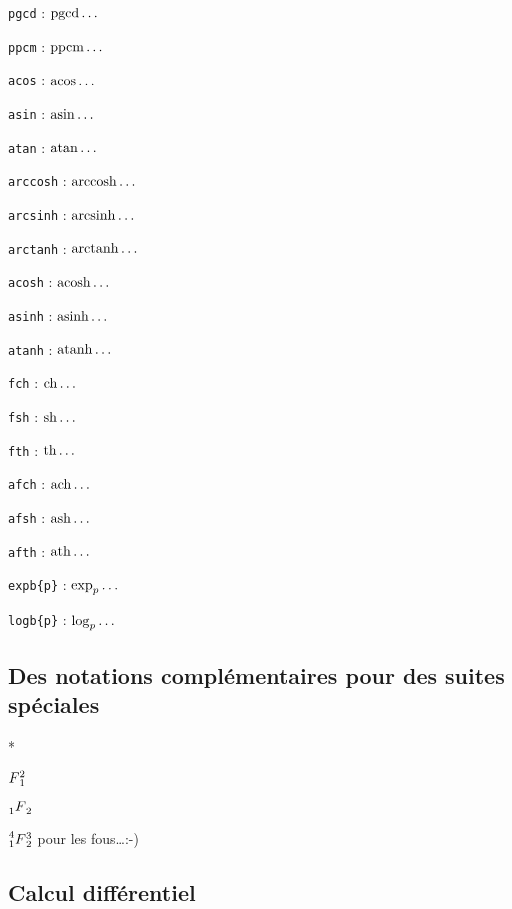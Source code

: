 \documentclass[12pt,a4paper]{article}
\makeatletter
\theoremstyle{definition}
\newcounter{paraexample}[subsubsection]
\newcommand\@newexample@abstract[2]{%
	\paragraph{%
		#1%
		\if\relax\detokenize{#2}\relax\else {} -- #2\fi%
	}%
}
\newcommand\newparaexample{\@ifstar{\@newparaexample@star}{\@newparaexample@no@star}}
\newcommand\@newparaexample@no@star[1]{%
	\refstepcounter{paraexample}%
	\@newexample@abstract{Exemple \theparaexample}{#1}%
}
\newcommand\@newparaexample@star[1]{%
	\@newexample@abstract{Exemple}{#1}%
}
\makeatother
\begin{document}
\begin{multicols}{2}
\verb+pgcd+ : $\pgcd\dots$

\verb+ppcm+ : $\ppcm\dots$

\verb+acos+ : $\acos\dots$

\verb+asin+ : $\asin\dots$

\verb+atan+ : $\atan\dots$

\verb+arccosh+ : $\arccosh\dots$

\verb+arcsinh+ : $\arcsinh\dots$

\verb+arctanh+ : $\arctanh\dots$

\verb+acosh+ : $\acosh\dots$

\verb+asinh+ : $\asinh\dots$

\verb+atanh+ : $\atanh\dots$

\verb+fch+ : $\fch\dots$

\verb+fsh+ : $\fsh\dots$

\verb+fth+ : $\fth\dots$

\verb+afch+ : $\afch\dots$

\verb+afsh+ : $\afsh\dots$

\verb+afth+ : $\afth\dots$

\verb+expb{p}+ : $\expb{p}\dots$

\verb+logb{p}+ : $\logb{p}\dots$
\end{multicols}

\subsection{Des notations complémentaires pour des suites spéciales}

\newparaexample*{}

\begin{latexex}
$\seqplus{F}{1}{2}$

$\seqhypergeo{F}{1}{2}$

$\seqsuprageo{F}{1}{2}{3}{4}$
pour les fous\dots :-)
\end{latexex}



\subsection{Calcul différentiel}
\end{document}
